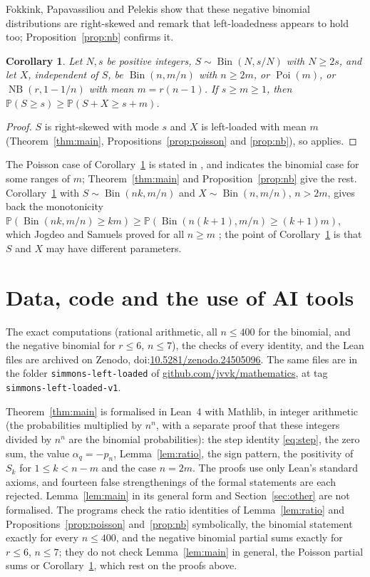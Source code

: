 \documentclass[11pt]{amsart}
\newcommand{\doi}[1]{doi:\href{https://doi.org/#1}{#1}}
\newtheorem{cor}[thm]{Corollary}
\theoremstyle{definition}
\theoremstyle{remark}
\DeclareMathOperator{\Bin}{Bin}
\DeclareMathOperator{\Poi}{Poi}
\DeclareMathOperator{\NB}{NB}
\newcommand{\Prob}{\mathbb P}
\begin{document}
Fokkink, Papavassiliou and Pelekis show that these negative binomial distributions are right-skewed
\cite[Lemma 3.3]{FPP} and remark that left-loadedness appears to hold too; Proposition~\ref{prop:nb} confirms it.

\begin{cor}\label{cor:tails}
Let $N,s$ be positive integers, $S\sim\Bin(N,s/N)$ with $N\ge2s$, and let $X$, independent of $S$, be $\Bin(n,m/n)$ with $n\ge2m$, or
$\Poi(m)$, or $\NB(r,1-1/n)$ with mean $m=r(n-1)$. If $s\ge m\ge1$, then $\Prob(S\ge s)\ge\Prob(S+X\ge s+m)$.
\end{cor}

\begin{proof}
$S$ is right-skewed with mode $s$ \cite[Lemma 3.2]{FPP} and $X$ is left-loaded with mean $m$ (Theorem~\ref{thm:main},
Propositions~\ref{prop:poisson} and \ref{prop:nb}), so \cite[Theorem 1.1]{FPP} applies.
\end{proof}

\noindent The Poisson case of Corollary~\ref{cor:tails} is stated in \cite{FPP}, and \cite[p.~140]{FPP} indicates
the binomial case for some ranges of $m$; Theorem~\ref{thm:main} and Proposition~\ref{prop:nb} give the rest. Corollary~\ref{cor:tails} with $S\sim\Bin(nk,m/n)$ and $X\sim\Bin(n,m/n)$, $n>2m$, gives back the
monotonicity $\Prob(\Bin(nk,m/n)\ge km)\ge\Prob(\Bin(n(k+1),m/n)\ge(k+1)m)$, which Jogdeo and Samuels proved for all
$n\ge m$ \cite{JS}; the point of Corollary~\ref{cor:tails} is that $S$ and $X$ may have different parameters.

\section{Data, code and the use of AI tools}\sloppy

The exact computations (rational arithmetic, all $n\le400$ for the binomial, and the negative binomial for $r\le6$,
$n\le7$), the checks of every identity, and the Lean files are archived on Zenodo, \doi{10.5281/zenodo.24505096}.
The same files are in the folder \texttt{simmons-left-loaded} of
\href{https://github.com/jvvk/mathematics}{github.com/jvvk/mathematics}, at tag \texttt{simmons-left-loaded-v1}.

Theorem~\ref{thm:main} is formalised in Lean~4 with Mathlib, in integer arithmetic (the probabilities multiplied by
$n^n$, with a separate proof that these integers divided by $n^n$ are the binomial probabilities): the step identity
\eqref{eq:step}, the zero sum, the value $\alpha_q=-p_n$, Lemma~\ref{lem:ratio}, the sign pattern, the positivity
of $S_k$ for $1\le k<n-m$ and the case $n=2m$. The proofs use only Lean's standard axioms, and fourteen false
strengthenings of the formal statements are each rejected. Lemma~\ref{lem:main} in its general form and
Section~\ref{sec:other} are not formalised. The programs check the ratio identities of Lemma~\ref{lem:ratio} and
Propositions~\ref{prop:poisson} and~\ref{prop:nb} symbolically, the binomial statement exactly for every $n\le400$,
and the negative binomial partial sums exactly for $r\le6$, $n\le7$; they do not check Lemma~\ref{lem:main} in
general, the Poisson partial sums or Corollary~\ref{cor:tails}, which rest on the proofs above.
\end{document}
